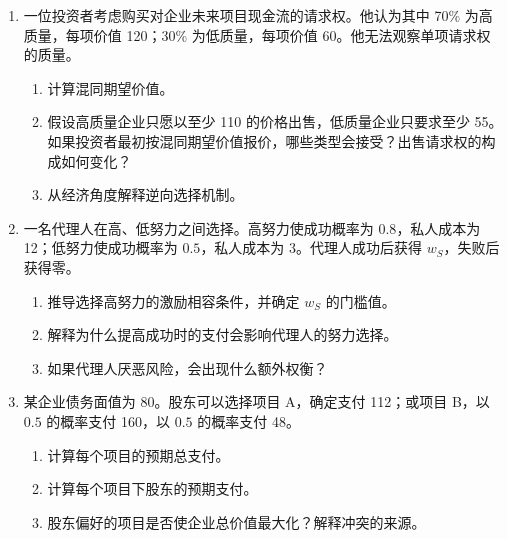 \begin{enumerate}

\item 一位投资者考虑购买对企业未来项目现金流的请求权。他认为其中 70\% 为高质量，每项价值 120；30\% 为低质量，每项价值 60。他无法观察单项请求权的质量。
    \begin{enumerate}

    \item 计算混同期望价值。
    
    \item 假设高质量企业只愿以至少 110 的价格出售，低质量企业只要求至少 55。如果投资者最初按混同期望价值报价，哪些类型会接受？出售请求权的构成如何变化？

    \item 从经济角度解释逆向选择机制。

    \end{enumerate}

\item 一名代理人在高、低努力之间选择。高努力使成功概率为 $0.8$，私人成本为 12；低努力使成功概率为 $0.5$，私人成本为 3。代理人成功后获得 $w_S$，失败后获得零。

  \begin{enumerate}

  \item 推导选择高努力的激励相容条件，并确定 $w_S$ 的门槛值。

  \item 解释为什么提高成功时的支付会影响代理人的努力选择。

  \item 如果代理人厌恶风险，会出现什么额外权衡？

  \end{enumerate}

\item 某企业债务面值为 80。股东可以选择项目 A，确定支付 112；或项目 B，以 $0.5$ 的概率支付 160，以 $0.5$ 的概率支付 48。

  \begin{enumerate}

  \item 计算每个项目的预期总支付。

  \item 计算每个项目下股东的预期支付。

  \item 股东偏好的项目是否使企业总价值最大化？解释冲突的来源。

  \end{enumerate}

\end{enumerate}

